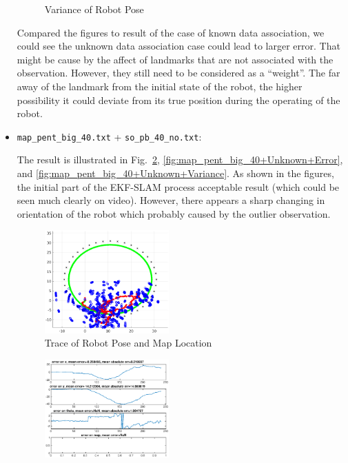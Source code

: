 \documentclass[conference]{IEEEtran}
\begin{document}
\begin{itemize}
\begin{figure}[htbp]
					\caption{Variance of Robot Pose}
					\label{fig:map_o3+Unknown+Variance}
				\end{figure}
			\par Compared the figures to result of the case of known data association, we could see the unknown data association case could lead to larger error. That might be cause by the affect of landmarks that are not associated with the observation. However, they still need to be considered as a ``weight''. The far away of the landmark from the initial state of the robot, the higher possibility it could deviate from its true position during the operating of the robot.
		\item \texttt{map\_pent\_big\_40.txt} + \texttt{so\_pb\_40\_no.txt}:
			\par The result is illustrated in Fig.~\ref{fig:map_pent_big_40+Unknown+Trace}, \ref{fig:map_pent_big_40+Unknown+Error}, and \ref{fig:map_pent_big_40+Unknown+Variance}. As shown in the figures, the initial part of the EKF-SLAM process acceptable result (which could be seen much clearly on video). However, there appears a sharp changing in orientation of the robot which probably caused by the outlier observation. 
				\begin{figure}[htbp]
					\centering
					\includegraphics[width=0.45\textwidth]{map_pent_big_40+Unknown+Trace.eps}
					\caption{Trace of Robot Pose and Map Location}
					\label{fig:map_pent_big_40+Unknown+Trace}
				\end{figure}
				\begin{figure}[htbp]
					\centering
					\includegraphics[width=0.45\textwidth]{map_pent_big_40+Unknown+Error.eps}

\end{figure}
\end{itemize}
\end{document}
